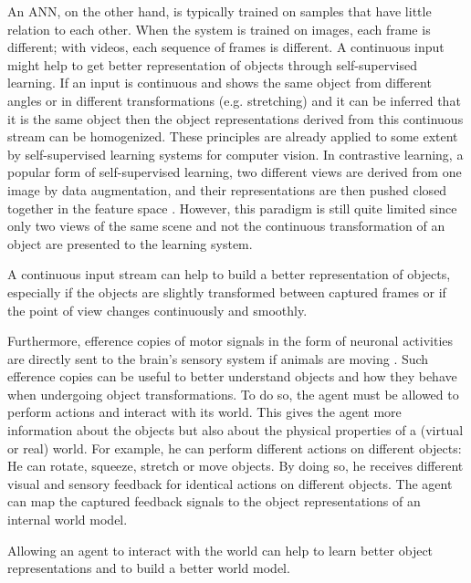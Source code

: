 An ANN, on the other hand, is typically trained on samples that have little relation to each other.
When the system is trained on images, each frame is different; with videos, each sequence of frames is different.
A continuous input might help to get better representation of objects through self-supervised learning.
If an input is continuous and shows the same object from different angles or in different transformations (e.g. stretching) and it can be inferred that it is the same object then the object representations derived from this continuous stream can be homogenized.
These principles are already applied to some extent by self-supervised learning systems for computer vision.
In contrastive learning, a popular form of self-supervised learning, two different views are derived from one image by data augmentation, and their representations are then pushed closed together in the feature space .
However, this paradigm is still quite limited since only two views of the same scene and not the continuous transformation of an object are presented to the learning system.

\begin{claim}
	A continuous input stream can help to build a better representation of objects, especially if the objects are slightly transformed between captured frames or if the point of view changes continuously and smoothly.
\end{claim}


Furthermore, efference copies of motor signals in the form of neuronal activities are directly sent to the brain’s sensory system if animals are moving .
Such efference copies can be useful to better understand objects and how they behave when undergoing object transformations.
To do so, the agent must be allowed to perform actions and interact with its world.
This gives the agent more information about the objects but also about the physical properties of a (virtual or real) world. For example, he can perform different actions on different objects: He can rotate, squeeze, stretch or move objects. By doing so, he receives different visual and sensory feedback for identical actions on different objects.
The agent can map the captured feedback signals to the object representations of an internal world model.

\begin{claim}
	Allowing an agent to interact with the world can help to learn better object representations and to build a better world model.
\end{claim}

